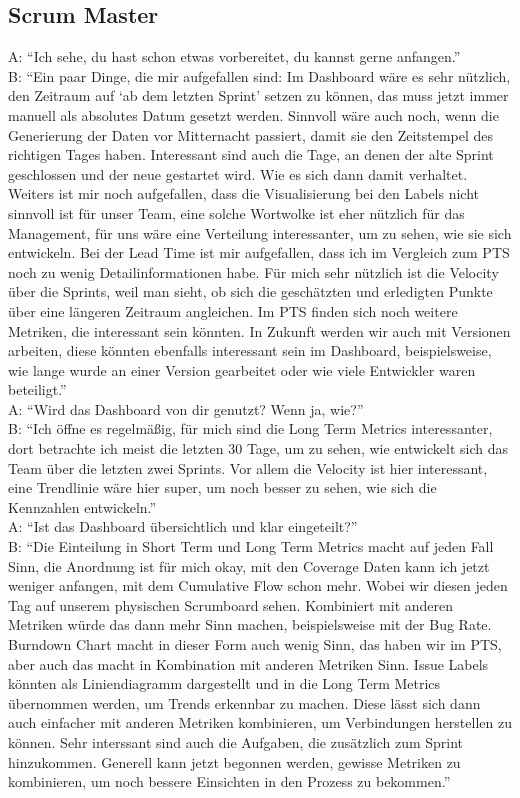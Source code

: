 \subsection{Scrum Master}

A\@: ``Ich sehe, du hast schon etwas vorbereitet, du kannst gerne anfangen.'' \\
B\@: ``Ein paar Dinge, die mir aufgefallen sind: Im Dashboard wäre es sehr nützlich, den Zeitraum auf `ab dem letzten Sprint' setzen zu können, das muss jetzt immer manuell als absolutes Datum gesetzt werden. Sinnvoll wäre auch noch, wenn die Generierung der Daten vor Mitternacht passiert, damit sie den Zeitstempel des richtigen Tages haben. Interessant sind auch die Tage, an denen der alte Sprint geschlossen und der neue gestartet wird. Wie es sich dann damit verhaltet. Weiters ist mir noch aufgefallen, dass die Visualisierung bei den Labels nicht sinnvoll ist für unser Team, eine solche Wortwolke ist eher nützlich für das Management, für uns wäre eine Verteilung interessanter, um zu sehen, wie sie sich entwickeln. Bei der Lead Time ist mir aufgefallen, dass ich im Vergleich zum \ac{PTS} noch zu wenig Detailinformationen habe. Für mich sehr nützlich ist die Velocity über die Sprints, weil man sieht, ob sich die geschätzten und erledigten Punkte über eine längeren Zeitraum angleichen. Im \ac{PTS} finden sich noch weitere Metriken, die interessant sein könnten. In Zukunft werden wir auch mit Versionen arbeiten, diese könnten ebenfalls interessant sein im Dashboard, beispielsweise, wie lange wurde an einer Version gearbeitet oder wie viele Entwickler waren beteiligt.'' \\
A\@: ``Wird das Dashboard von dir genutzt? Wenn ja, wie?'' \\
B\@: ``Ich öffne es regelmäßig, für mich sind die Long Term Metrics interessanter, dort betrachte ich meist die letzten 30 Tage, um zu sehen, wie entwickelt sich das Team über die letzten zwei Sprints. Vor allem die Velocity ist hier interessant, eine Trendlinie wäre hier super, um noch besser zu sehen, wie sich die Kennzahlen entwickeln.'' \\
A\@: ``Ist das Dashboard übersichtlich und klar eingeteilt?'' \\
B\@: ``Die Einteilung in Short Term und Long Term Metrics macht auf jeden Fall Sinn, die Anordnung ist für mich okay, mit den Coverage Daten kann ich jetzt weniger anfangen, mit dem Cumulative Flow schon mehr. Wobei wir diesen jeden Tag auf unserem physischen Scrumboard sehen. Kombiniert mit anderen Metriken würde das dann mehr Sinn machen, beispielsweise mit der Bug Rate. Burndown Chart macht in dieser Form auch wenig Sinn, das haben wir im \ac{PTS}, aber auch das macht in Kombination mit anderen Metriken Sinn. Issue Labels könnten als Liniendiagramm dargestellt und in die Long Term Metrics übernommen werden, um Trends erkennbar zu machen. Diese lässt sich dann auch einfacher mit anderen Metriken kombinieren, um Verbindungen herstellen zu können. Sehr interssant sind auch die Aufgaben, die zusätzlich zum Sprint hinzukommen. Generell kann jetzt begonnen werden, gewisse Metriken zu kombinieren, um noch bessere Einsichten in den Prozess zu bekommen.'' \\
